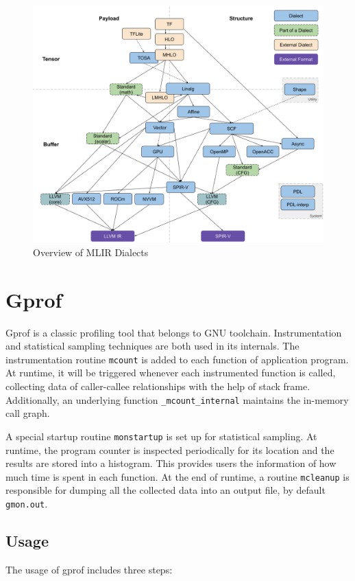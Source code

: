 \begin{figure}[ht]
    \centering
    \includegraphics[width=0.8\linewidth]{figures/MLIR_dialect_overview.png}
    \caption{Overview of MLIR Dialects\cite{alexmlir}}
    \label{fig:mlir_dialects_overview}
\end{figure}

\section{Gprof}
Gprof is a classic profiling tool that belongs to GNU toolchain. Instrumentation and statistical sampling techniques are both used in its internals. The instrumentation routine \texttt{mcount} is added to each function of application program. At runtime, it will be triggered whenever each instrumented function is called, collecting data of caller-callee relationships with the help of stack frame. Additionally, an underlying function \texttt{\_mcount\_internal} maintains the in-memory call graph.

A special startup routine \texttt{monstartup} is set up for statistical sampling. At runtime, the program counter is inspected periodically for its location and the results are stored into a histogram. This provides users the information of how much time is spent in each function. At the end of runtime, a routine \texttt{mcleanup} is responsible for dumping all the collected data into an output file, by default \texttt{gmon.out}.

\subsection{Usage}
The usage of gprof includes three steps:

